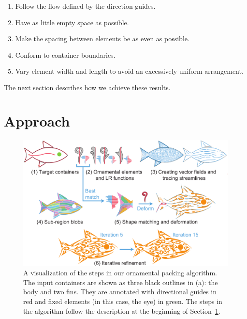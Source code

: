 \begin{enumerate}
	\item Follow the flow defined by the direction guides.
	\item Have as little empty space as possible.
	\item Make the spacing between elements be as even as possible.
	\item Conform to container boundaries.
	\item Vary element width and length to avoid an excessively uniform arrangement.
\end{enumerate}
The next section describes how we achieve these results.

\section{Approach}
\label{flowpak_approach}

\begin{figure}[h!]
\centering
\includegraphics[width=1.0\textwidth]{figures/flowpak/pipeline.pdf} 
\caption[FLOWPAK pipeline]
{\label{fig_flowpak_pipeline} 
A visualization of the steps in our ornamental packing algorithm.
The input containers are shown as three black outlines in (a): the body
and two fins.  They are annotated with directional guides in red and fixed elements (in this 
case, the eye) in green.  The steps in the algorithm follow the
description at the beginning of Section~\ref{flowpak_approach}.
}
\end{figure}


